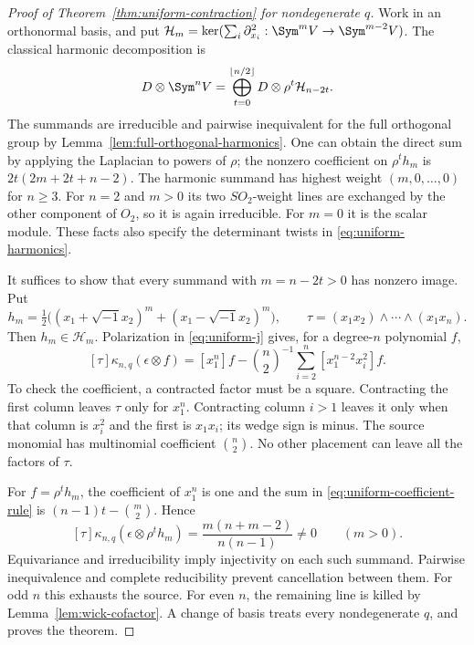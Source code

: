 \begin{proof}[Proof of Theorem~\ref{thm:uniform-contraction} for nondegenerate \(q\)]
Work in an orthonormal basis, and put
\(\mathcal H_m=\ker(\sum_i\partial_{x_i}^2:\Sym^mV\to\Sym^{m-2}V)\).
The classical harmonic decomposition is
\begin{equation}\label{eq:uniform-harmonics}
 D\otimes\Sym^nV=
   \bigoplus_{t=0}^{\lfloor n/2\rfloor}D\otimes\rho^t\mathcal H_{n-2t}.
\end{equation}
The summands are irreducible and pairwise inequivalent for the full
orthogonal group by Lemma~\ref{lem:full-orthogonal-harmonics}.  One can obtain the direct sum
by applying the Laplacian to powers of \(\rho\); the nonzero
coefficient on \(\rho^th_m\) is
\(2t(2m+2t+n-2)\).  The harmonic summand has highest weight
\((m,0,\ldots,0)\) for \(n\ge3\).  For \(n=2\) and \(m>0\)
its two \(SO_2\)-weight lines are exchanged by the other component
of \(O_2\), so it is again irreducible.  For \(m=0\) it is the
scalar module.  These facts also specify the determinant twists in
\eqref{eq:uniform-harmonics}.

It suffices to show that every summand with \(m=n-2t>0\) has
nonzero image.  Put
\[
 h_m=\tfrac12\bigl((x_1+\sqrt{-1}x_2)^m+
                         (x_1-\sqrt{-1}x_2)^m\bigr),\qquad
 \tau=(x_1x_2)\wedge\cdots\wedge(x_1x_n).
\]
Then \(h_m\in\mathcal H_m\).  Polarization in
\eqref{eq:uniform-j} gives, for a degree-\(n\) polynomial \(f\),
\begin{equation}\label{eq:uniform-coefficient-rule}
 [\tau]\kappa_{n,q}(\epsilon\otimes f)=
 [x_1^n]f-\binom n2^{-1}\sum_{i=2}^n[x_1^{n-2}x_i^2]f.
\end{equation}
To check the coefficient, a contracted factor must be a square.
Contracting the first column leaves \(\tau\) only for \(x_1^n\).
Contracting column \(i>1\) leaves it only when that column is
\(x_i^2\) and the first is \(x_1x_i\); its wedge sign is minus.
The source monomial has multinomial coefficient \(\binom n2\).
No other placement can leave all the factors of \(\tau\).

For \(f=\rho^t h_m\), the coefficient of \(x_1^n\) is one
and the sum in \eqref{eq:uniform-coefficient-rule} is
\((n-1)t-\binom m2\).  Hence
\begin{equation}\label{eq:uniform-harmonic-nonzero}
 [\tau]\kappa_{n,q}(\epsilon\otimes\rho^t h_m)
   =\frac{m(n+m-2)}{n(n-1)}\ne0\qquad(m>0).
\end{equation}
Equivariance and irreducibility imply injectivity on each such
summand.  Pairwise inequivalence and complete reducibility prevent
cancellation between them.  For odd \(n\) this exhausts the source.
For even \(n\), the remaining line is killed by
Lemma~\ref{lem:wick-cofactor}.  A change of basis treats every
nondegenerate \(q\), and proves the theorem.
\end{proof}

